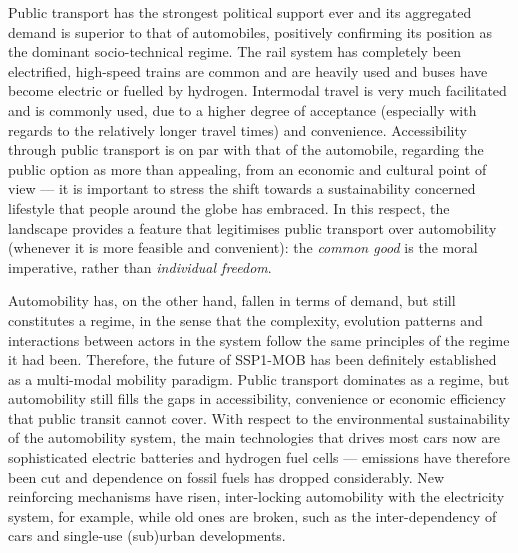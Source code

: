 Public transport has the strongest political support ever and its aggregated demand is superior to that of automobiles, positively confirming its position as the dominant socio-technical regime. The rail system has completely been electrified, high-speed trains are common and are heavily used and buses have become electric or fuelled by hydrogen. Intermodal travel is very much facilitated and is commonly used, due to a higher degree of acceptance (especially with regards to the relatively longer travel times) and convenience. Accessibility through public transport is on par with that of the automobile, regarding the public option as more than appealing, from an economic and cultural point of view --- it is important to stress the shift towards a sustainability concerned lifestyle that people around the globe has embraced. In this respect, the landscape provides a feature that legitimises public transport over automobility (whenever it is more feasible and convenient): the \emph{common good} is the moral imperative, rather than \emph{individual freedom}.

Automobility has, on the other hand, fallen in terms of demand, but still constitutes a regime, in the sense that the complexity, evolution patterns and interactions between actors in the system follow the same principles of the regime it had been. Therefore, the future of SSP1-MOB has been definitely established as a multi-modal mobility paradigm. Public transport dominates as a regime, but automobility still fills the gaps in accessibility, convenience or economic efficiency that public transit cannot cover. With respect to the environmental sustainability of the automobility system, the main technologies that drives most cars now are sophisticated electric batteries and hydrogen fuel cells ---  emissions have therefore been cut and dependence on fossil fuels has dropped considerably. New reinforcing mechanisms have risen, inter-locking automobility with the electricity system, for example, while old ones are broken, such as the inter-dependency of cars and single-use (sub)urban developments.

